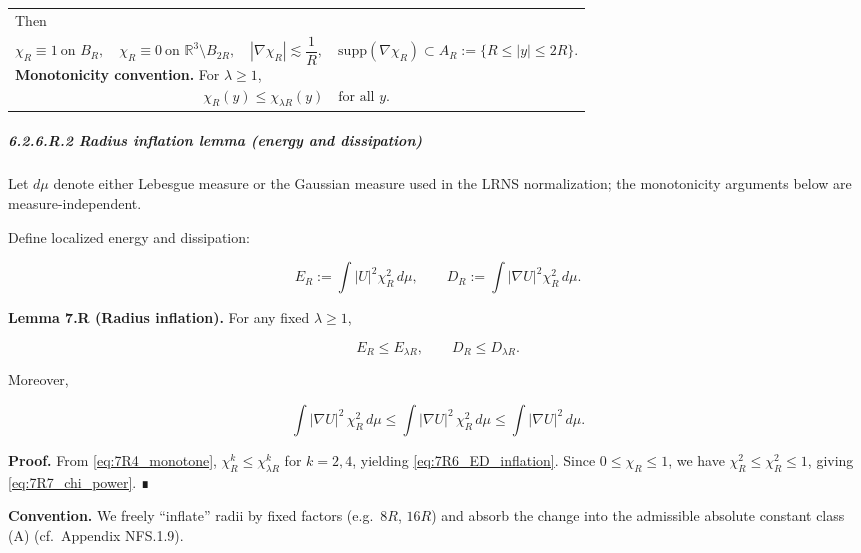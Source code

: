\documentclass[
  11pt,
]{article}
\begin{document}
\begin{longtable}[]{@{}
  >{\raggedleft\arraybackslash}p{}@{}}
Then \\
\begin{equation}
\chi_R\equiv 1\ \text{on }B_{R},\quad
\chi_R\equiv 0\ \text{on }\mathbb{R}^3\setminus B_{2R},\quad
|\nabla\chi_R|\lesssim \frac{1}{R},\quad
\mathrm{supp}(\nabla\chi_R)\subset A_R:=\{R\le|y|\le 2R\}.
\tag{7.R3}\label{eq:7R3_cutoff_props}
\end{equation}
\textbf{Monotonicity convention.} For \(\lambda\ge 1\), \\
\begin{equation}
\chi_R(y)\le \chi_{\lambda R}(y)\quad\text{for all }y.
\tag{7.R4}\label{eq:7R4_monotone}
\end{equation}
\bottomrule
\end{longtable}

\hypertarget{r.2-radius-inflation-lemma-energy-and-dissipation}{%
\subparagraph{6.2.6.R.2 Radius inflation lemma (energy and dissipation)}\label{r.2-radius-inflation-lemma-energy-and-dissipation}}

Let \(d\mu\) denote either Lebesgue measure or the Gaussian measure used in the LRNS normalization; the monotonicity arguments below are measure-independent.

Define localized energy and dissipation:

\begin{equation}
E_R:=\int |U|^2 \chi_R^2\,d\mu,\qquad
D_R:=\int |\nabla U|^2 \chi_R^2\,d\mu.
\tag{7.R5}\label{eq:7R5_ED_defs}
\end{equation}

\textbf{Lemma 7.R (Radius inflation).} For any fixed \(\lambda\ge 1\),

\begin{equation}
E_R \le E_{\lambda R},\qquad D_R \le D_{\lambda R}.
\tag{7.R6}\label{eq:7R6_ED_inflation}
\end{equation}

Moreover,

\begin{equation}
\int |\nabla U|^2\,\chi_R^2\,d\mu \le \int |\nabla U|^2\,\chi_R^2\,d\mu \le \int |\nabla U|^2\,d\mu.
\tag{7.R7}\label{eq:7R7_chi_power}
\end{equation}

\textbf{Proof.} From \eqref{eq:7R4_monotone}, \(\chi_R^k\le \chi_{\lambda R}^k\) for \(k=2,4\), yielding \eqref{eq:7R6_ED_inflation}. Since \(0\le \chi_R\le 1\), we have \(\chi_R^2\le \chi_R^2\le 1\), giving \eqref{eq:7R7_chi_power}. ∎

\textbf{Convention.} We freely ``inflate'' radii by fixed factors (e.g.~\(8R\), \(16R\)) and absorb the change into the admissible absolute constant class (A) (cf.~Appendix NFS.1.9).
\end{document}
